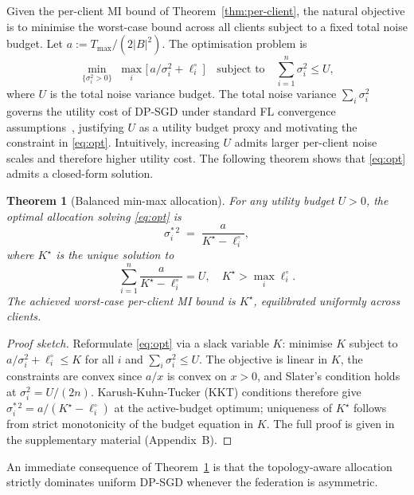 \documentclass[letterpaper,journal]{IEEEtran}
\newtheorem{theorem}{Theorem}[section]
\begin{document}
Given the per-client MI bound of Theorem~\ref{thm:per-client}, the
natural objective is to minimise the worst-case bound across all
clients subject to a fixed total noise budget. Let $a := T_{\max} /
(2|B|^2)$. The optimisation problem is
\begin{equation}
\min_{\{\sigma_i^2 > 0\}}\; \max_i \big[\, a / \sigma_i^2 +
\ell_i^\circ\, \big]
\quad \text{subject to} \quad
\sum_{i=1}^n \sigma_i^2 \leq U,
\label{eq:opt}
\end{equation}
where $U$ is the total noise variance budget. The total noise
variance $\sum_i \sigma_i^2$ governs the utility cost of DP-SGD
under standard FL convergence assumptions~\cite{wei2020nbafl},
justifying $U$ as a utility budget proxy and motivating the
constraint in \eqref{eq:opt}. Intuitively, increasing $U$ admits
larger per-client noise scales and therefore higher utility cost.
The following theorem shows that \eqref{eq:opt} admits a closed-form
solution.

\begin{theorem}[Balanced min-max allocation]
\label{thm:allocation}
For any utility budget $U > 0$, the optimal allocation solving
\eqref{eq:opt} is
\begin{equation}
\sigma_i^{*\,2} \;=\; \frac{a}{K^\star - \ell_i^\circ},
\label{eq:sigma-star}
\end{equation}
where $K^\star$ is the unique solution to
\begin{equation}
\sum_{i=1}^n \frac{a}{K^\star - \ell_i^\circ} = U,
\quad
K^\star > \max_i \ell_i^\circ.
\label{eq:budget-eq}
\end{equation}
The achieved worst-case per-client MI bound is $K^\star$,
equilibrated uniformly across clients.
\end{theorem}

\begin{proof}[Proof sketch]
Reformulate \eqref{eq:opt} via a slack variable $K$: minimise $K$
subject to $a/\sigma_i^2 + \ell_i^\circ \leq K$ for all $i$ and
$\sum_i \sigma_i^2 \leq U$. The objective is linear in $K$, the
constraints are convex since $a/x$ is convex on $x > 0$, and
Slater's condition holds at $\sigma_i^2 = U/(2n)$.
Karush-Kuhn-Tucker (KKT) conditions therefore give $\sigma_i^{*\,2}
= a/(K^\star - \ell_i^\circ)$ at the active-budget optimum;
uniqueness of $K^\star$ follows from strict monotonicity of the
budget equation in $K$. The full proof is given in the supplementary
material (Appendix~B).
\end{proof}

An immediate consequence of Theorem~\ref{thm:allocation} is that the
topology-aware allocation strictly dominates uniform DP-SGD whenever
the federation is asymmetric.
\end{document}
